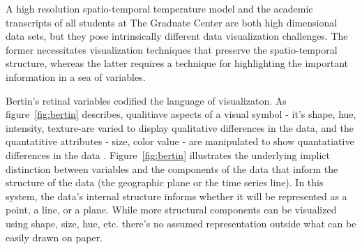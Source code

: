 \documentclass[../main.text]{subfiles}
\begin{document}
A high resolution spatio-temporal temperature model and the academic
transcripts of all students at The Graduate Center are both high dimensional
data sets, but they pose intrinsically different data visualization
challenges. The former necessitates visualization techniques that preserve the
spatio-temporal structure, whereas the latter requires a technique for
highlighting the important information in a sea of variables. 



Bertin's retinal variables codified the language of visualizaton. As
figure~\ref{fig:bertin} describes, qualitiave aspects of a visual symbol -
it's shape, hue, intensity, texture-are varied to display qualitative
differences in the data, and the quantatitive attributes - size, color value -
are manipulated to show quantatiative differences in the data
\cite{bertin1983, krygier2016}. Figure~\ref{fig:bertin} illustrates the
underlying implict distinction between variables and the components of the data
that inform the structure of the data (the geographic plane or the time series
line). In this system, the data's internal structure informs whether it will be
represented as a point, a line, or a plane. While more structural components
can be visualized using shape, size, hue, etc. there's no assumed
representation outside what can be easily drawn on paper.  



\cite{wilkinson2006}
\end{document}
